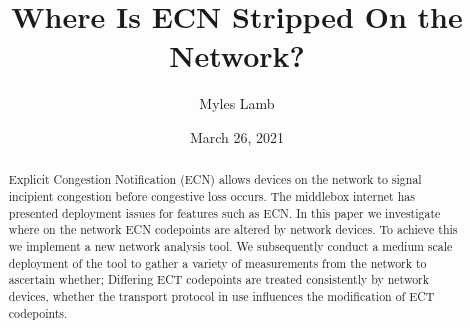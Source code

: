 \documentclass{l4proj}
\begin{document}
\title{Where Is ECN Stripped On the Network?}
\author{Myles Lamb}
\date{March 26, 2021}

\maketitle

\begin{abstract}
    
    
 Explicit Congestion Notification (ECN) allows devices on the network to signal incipient congestion before congestive loss occurs. The middlebox internet has presented deployment issues for features such as ECN. In this paper we investigate where on the network ECN codepoints are altered by network devices. To achieve this we implement a new network analysis tool. We subsequently conduct a medium scale deployment of the tool to gather a variety of measurements from the network to ascertain whether; Differing ECT codepoints are treated consistently by network devices, whether the transport protocol in use influences the modification of ECT codepoints. 
    
\end{abstract}


%
%
\def\consentname {Myles Lamb} %
\def\consentdate {26 March 2021} %
\end{document}
